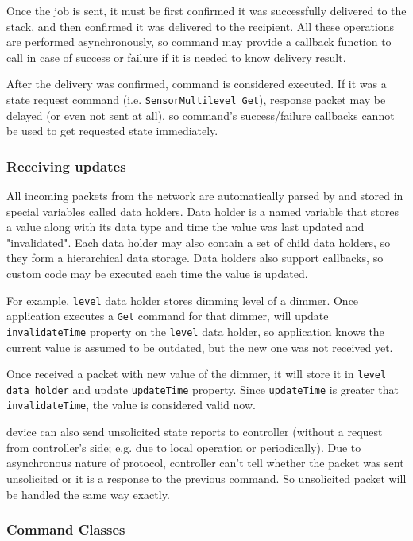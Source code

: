 Once the job is sent, it must be first confirmed it was successfully delivered to 
the \zwave stack, and then confirmed it was delivered to the recipient. All these operations are 
performed asynchronously, so command may provide a callback function to call in case of 
success or failure if it is needed to know delivery result.

After the delivery was confirmed, command is considered executed. If it was a state 
request command (i.e. \texttt{SensorMultilevel Get}), response packet may be delayed 
(or even not sent at all), so command's success/failure callbacks cannot be used to get 
requested state immediately.

\subsubsection{Receiving updates}

All incoming packets from the \zwave network are automatically parsed by \zway and stored in 
special variables called data holders. Data holder is a named variable that stores a value 
along with its data type and time the value was last updated and "invalidated". Each data
holder may also contain a set of child data holders, so they form a hierarchical data 
storage. Data holders also support callbacks, so custom code may be executed each time 
the value is updated.


For example, \texttt{level} data holder stores dimming level of a dimmer. Once application 
executes a \texttt{Get} command for that dimmer, \zway will update \texttt{invalidateTime} property on 
the \texttt{level} data holder, so application knows the current value is assumed to be 
outdated, but the new one was not received yet.

Once \zway received a packet with new value of the dimmer, it will store it in \texttt{level 
data holder} and update \texttt{updateTime} property. Since \texttt{updateTime} is 
greater that \texttt{invalidateTime}, the value is considered valid now.

\zwave device can also send unsolicited state reports to controller (without a request 
from controller's side; e.g. due to local operation or periodically). Due to asynchronous 
nature of \zwave protocol, controller can't tell whether the packet was sent unsolicited 
or it is a response to the previous command. So unsolicited packet will be handled the 
same way exactly.

\subsubsection{Command Classes}

